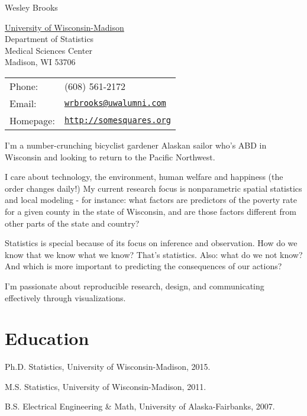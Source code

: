 \documentclass[letterpaper]{article}
\def\name{Wesley Brooks}
\renewenvironment{itemize}{
  \begin{list}{}{
    \setlength{\leftmargin}{1.5em}
  }
}{
  \end{list}
}
\begin{document}
{\huge \name}


\vspace{0.25in}

\begin{minipage}{0.45\linewidth}
  \href{http://www.stat.wisc.edu/}{University of Wisconsin-Madison} \\
  Department of Statistics \\
  Medical Sciences Center \\
  Madison, WI 53706
\end{minipage}
\begin{minipage}{0.45\linewidth}
  \begin{tabular}{ll}
    Phone: & (608) 561-2172 \\
    Email: & \href{mailto:wrbrooks@uwalumni.com}{\tt wrbrooks@uwalumni.com} \\
    Homepage: & \href{http://somesquares.org}{\tt http://somesquares.org} \\
  \end{tabular}
\end{minipage}

I'm a number-crunching bicyclist gardener Alaskan sailor who's ABD in Wisconsin and looking to return to the Pacific Northwest.

I care about technology, the environment, human welfare and happiness (the order changes daily!) My current research focus is nonparametric spatial statistics and local modeling - for instance: what factors are predictors of the poverty rate for a given county in the state of Wisconsin, and are those factors different from other parts of the state and country?

Statistics is special because of its focus on inference and observation. How do we know that we know what we know? That's statistics. Also: what do we not know? And which is more important to predicting the consequences of our actions?

I'm passionate about reproducible research, design, and communicating effectively through visualizations.

\section*{Education}

\begin{itemize}
    \item Ph.D. Statistics, University of Wisconsin-Madison, 2015.
    \item M.S. Statistics, University of Wisconsin-Madison, 2011.
    \item B.S. Electrical Engineering \& Math, University of Alaska-Fairbanks, 2007.
\end{itemize}
\end{document}
